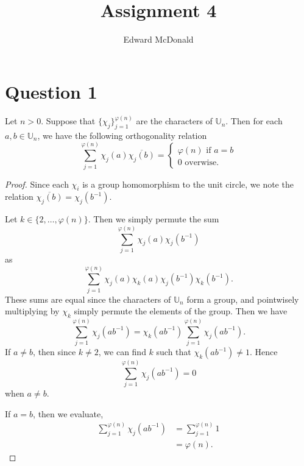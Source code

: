 \documentclass{unswmaths}
\begin{document}
\subject{Number Theory}
\author{Edward McDonald}
\title{Assignment 4}


\setlength\parindent{0pt}

\newcommand{\Unit}{\mathbb{U}}
\newcommand{\modulo}[1]{\;\operatorname{mod}\;#1}

\unswtitle{}

\section*{Question 1}
    \begin{lemma}
        \label{charOrth}
        Let $n > 0$. Suppose that $\{\chi_j\}_{j=1}^{\varphi(n)}$ are the characters
        of $\Unit_n$. Then for each $a,b\in \Unit_n$, we have the following orthogonality
        relation
        \begin{equation*}
            \sum_{j=1}^{\varphi(n)} \chi_j(a)\overline{\chi_j(b)} = \begin{cases}
                \varphi(n)\text{ if }a = b\\
                0\text{ overwise.}
            \end{cases}
        \end{equation*}
    \end{lemma}
    \begin{proof}
        Since each $\chi_i$ is a group homomorphism to the unit circle,
        we note the relation $\overline{\chi_j(b)} = \chi_j(b^{-1})$. 
        
        Let $k \in \{2,\ldots,\varphi(n)\}$. Then we simply permute
        the sum
        \begin{equation*}
            \sum_{j=1}^{\varphi(n)} \chi_j(a)\chi_j(b^{-1})
        \end{equation*}
        as
        \begin{equation*}
            \sum_{j=1}^{\varphi(n)} \chi_j(a)\chi_k(a)\chi_j(b^{-1})\chi_{k}(b^{-1}).
        \end{equation*}
        These sums are equal since the characters of $\Unit_n$ form a group, and pointwisely
        multiplying by $\chi_k$ simply permute the elements of the group. Then we have
        \begin{equation*}
            \sum_{j=1}^{\varphi(n)} \chi_j(ab^{-1}) = \chi_k(ab^{-1})\sum_{j=1}^{\varphi(n)} \chi_j(ab^{-1}).
        \end{equation*}
        If $a \neq b$, then since $k \neq 2$, we can find $k$ such that $\chi_k(ab^{-1}) \neq 1$. Hence
        \begin{equation*}
            \sum_{j=1}^{\varphi(n)} \chi_j(ab^{-1}) = 0
        \end{equation*}
        when $a\neq b$.
        
        If $a = b$, then we evaluate,
        \begin{align*}
            \sum_{j=1}^{\varphi(n)} \chi_j(ab^{-1}) &= \sum_{j=1}^{\varphi(n)} 1\\
            &= \varphi(n).
        \end{align*}
    \end{proof}
\end{document}
